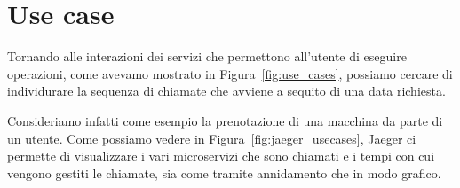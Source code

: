 \section{Use case}
Tornando alle interazioni dei servizi che permettono all'utente di eseguire operazioni, come avevamo mostrato in Figura~\ref{fig:use_cases}, possiamo cercare di individurare la sequenza di chiamate che avviene a sequito di una data richiesta.

Consideriamo infatti come esempio la prenotazione di una macchina da parte di un utente. Come possiamo vedere in Figura~\ref{fig:jaeger_usecases}, Jaeger ci permette di visualizzare i vari microservizi che sono chiamati e i tempi con cui vengono gestiti le chiamate, sia come tramite annidamento che in modo grafico.